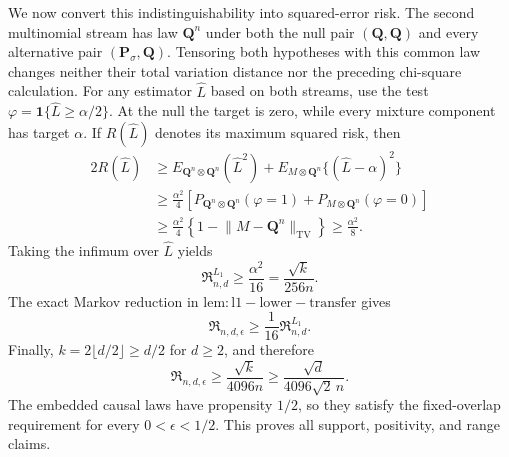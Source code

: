 We now convert this indistinguishability into squared-error risk.  The second multinomial stream has law \(\mathbf Q^n\) under both the null pair \((\mathbf Q,\mathbf Q)\) and every alternative pair \((\mathbf P_\sigma,\mathbf Q)\).  Tensoring both hypotheses with this common law changes neither their total variation distance nor the preceding chi-square calculation.  For any estimator \(\widehat L\) based on both streams, use the test \(\varphi=\mathbf 1\{\widehat L\ge\alpha/2\}\).  At the null the target is zero, while every mixture component has target \(\alpha\).  If \(R(\widehat L)\) denotes its maximum squared risk, then
\[
 \begin{aligned}
 2R(\widehat L)
 &\ge E_{\mathbf Q^n\otimes\mathbf Q^n}(\widehat L^2)
   +E_{M\otimes\mathbf Q^n}\{(\widehat L-\alpha)^2\}\\
 &\ge\frac{\alpha^2}{4}
 \left[
  P_{\mathbf Q^n\otimes\mathbf Q^n}(\varphi=1)
  +P_{M\otimes\mathbf Q^n}(\varphi=0)
 \right]\\
 &\ge\frac{\alpha^2}{4}
 \left\{1-\lVert M-\mathbf Q^n\rVert_{\mathrm{TV}}\right\}
 \ge\frac{\alpha^2}{8}.
 \end{aligned}
\]
Taking the infimum over \(\widehat L\) yields
\[
 \mathfrak R^{L_1}_{n,d}\ge\frac{\alpha^2}{16}
 =\frac{\sqrt{k}}{256n}.
\]
The exact Markov reduction in \(\mathrm{lem:l1-lower-transfer}\) gives
\[
 \mathfrak R_{n,d,\epsilon}
 \ge\frac1{16}\mathfrak R^{L_1}_{n,d}.
\]
Finally, \(k=2\lfloor d/2\rfloor\ge d/2\) for \(d\ge2\), and therefore
\[
 \mathfrak R_{n,d,\epsilon}
 \ge\frac{\sqrt{k}}{4096n}
 \ge\frac{\sqrt d}{4096\sqrt2\,n}.
\]
The embedded causal laws have propensity \(1/2\), so they satisfy the fixed-overlap requirement for every \(0<\epsilon<1/2\).  This proves all support, positivity, and range claims.
